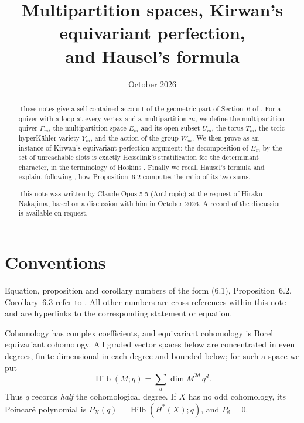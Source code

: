 \documentclass[11pt]{amsart}
\theoremstyle{definition}
\theoremstyle{remark}
\numberwithin{equation}{section}
\DeclareMathOperator{\Hilb}{Hilb}
\begin{document}
\title[Multipartition spaces, Kirwan perfection and Hausel's formula]{Multipartition spaces, Kirwan's
equivariant perfection,\\ and Hausel's formula}
\date{October 2026}

\begin{abstract}
These notes give a self-contained account of the geometric part of Section~6 of \cite{Hik}. For a
quiver with a loop at every vertex and a multipartition $m$, we define the multipartition quiver
$\Gamma_m$, the multipartition space $E_m$ and its open subset $U_m$, the torus $T_m$, the toric
hyperK\"ahler variety $Y_m$, and the action of the group $W_m$. We then prove
\cite[Proposition~6.2]{Hik} as an instance of Kirwan's equivariant perfection argument: the
decomposition of $E_m$ by the set of unreachable slots is exactly Hesselink's stratification for the
determinant character, in the terminology of Hoskins \cite{Hos}. Finally we recall Hausel's formula and
explain, following \cite[Corollary~6.3]{Hik}, how Proposition~6.2 computes the ratio of its two sums.

This note was written by Claude Opus 5.5 (Anthropic) at the request of Hiraku Nakajima, based on a
discussion with him in October 2026. A record of the discussion is available on request.
\end{abstract}

\maketitle

\setcounter{tocdepth}{1}
\tableofcontents

\section*{Conventions}

Equation, proposition and corollary numbers of the form (6.1), Proposition~6.2, Corollary~6.3 refer to
\cite{Hik}. All other numbers are cross-references within this note and are hyperlinks to the
corresponding statement or equation.

Cohomology has complex coefficients, and equivariant cohomology is Borel equivariant cohomology. All
graded vector spaces below are concentrated in even degrees, finite-dimensional in each degree and
bounded below; for such a space we put
\[
  \Hilb(M;q)=\sum_{d}\dim M^{2d}\,q^{d}.
\]
Thus $q$ records \emph{half} the cohomological degree. If $X$ has no odd cohomology, its Poincar\'e
polynomial is $P_X(q)=\Hilb(H^*(X);q)$, and $P_\emptyset=0$.
\end{document}
